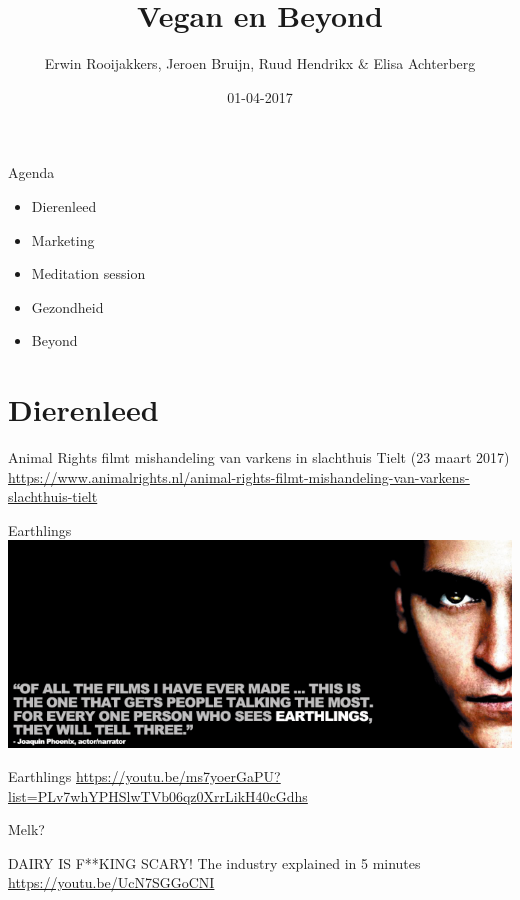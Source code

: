 \documentclass[presentation]{beamer}
\author{Erwin Rooijakkers, Jeroen Bruijn, Ruud Hendrikx \& Elisa Achterberg}
\date{01-04-2017}
\title{Vegan en Beyond}
\begin{document}
\maketitle

\begin{frame}[label=sec-0-1]{Agenda}
\begin{itemize}
\item Dierenleed
\item Marketing
\item Meditation session
\item Gezondheid
\item Beyond
\end{itemize}
\end{frame}

\section{Dierenleed}
\label{sec-1}

\begin{frame}[label=sec-1-1]{Animal Rights filmt mishandeling van varkens in slachthuis Tielt (23 maart 2017)}
\url{https://www.animalrights.nl/animal-rights-filmt-mishandeling-van-varkens-slachthuis-tielt}
\end{frame}

\begin{frame}[label=sec-1-2]{Earthlings}
\includegraphics[width=.9\linewidth]{../images/earthlings.png}

\begin{alertblock}{Earthlings}
\url{https://youtu.be/ms7yoerGaPU?list=PLv7whYPHSlwTVb06qz0XrrLikH40cGdhs}
\end{alertblock}
\end{frame}

\begin{frame}[label=sec-1-3]{Melk?}
\begin{alertblock}{DAIRY IS F**KING SCARY! The industry explained in 5 minutes}
\url{https://youtu.be/UcN7SGGoCNI}
\end{alertblock}
\end{frame}
\end{document}
